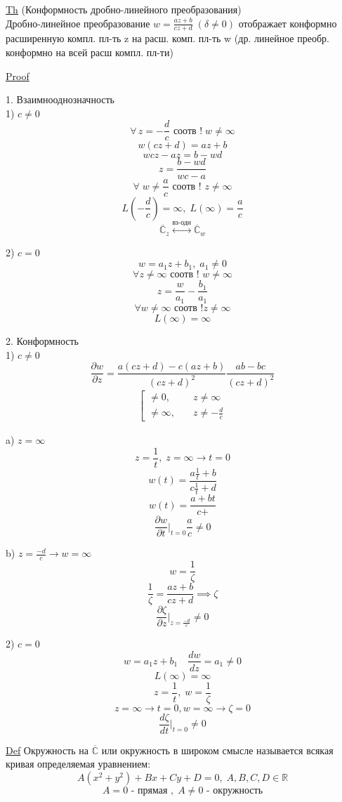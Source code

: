 \documentclass[a4paper]{article}
\begin{document}
\begin{tcolorbox}
\underline{Th} (Конформность дробно-линейного преобразования)\\
Дробно-линейное преобразование $ w = \frac{az + b}{cz + d}\; (\delta \neq 0) $ 
отображает конформно расширенную компл. пл-ть z на расш. комп. пл-ть w
(др. линейное преобр. конформно на всей расш компл. пл-ти)

\underline{Proof}

1. Взаимнооднозначность\\
1) $ c \neq 0 $ 
\[
    \forall \, z = -\frac{d}{c} \text{ соотв } !\; w \neq \infty
\]
\[
    w(cz+d) = az + b
\]
\[
    wcz - az = b -wd
\]
\[
    z = \frac{b - wd}{wc-a} 
\]
\[
    \forall \; w \neq \frac{a}{c} \text{ соотв ! } z \neq \infty
\]
\[
    L(-\frac{d}{c}) = \infty, \; L(\infty) = \frac{a}{c} 
\]
\[
    \mathbb{\overline{C}}_{z} \stackrel{\text{вз-одн}}{\leftrightarrow}
    \mathbb{\overline{C}}_{w}
\]

2) $ c = 0 $ 
\[
    w = a_1 z + b_1, \; a_1 \neq 0
\]
\[
    \forall z \neq \infty \text{ соотв ! } w \neq \infty
\]
\[
    z = \frac{w}{a_1} - \frac{b_1}{a_1} 
\]
\[
    \forall w \neq \infty \text{ соотв !} z \neq \infty
\]
\[
    L(\infty) = \infty
\]

2. Конформность\\
1) $ c \neq 0 $ 
\[
    \frac{\partial w}{\partial z} = \frac{a(cz+d) - c(az+b)}{(cz+d)^2} 
    \frac{ab - bc}{(cz+d)^2} 
\]
\begin{align*}
    \left[
    \begin{array}{ll}
        \neq 0, &\quad z \neq \infty \\
        \neq \infty, &\quad z \neq -\frac{d}{c} 
    \end{array}
    \right .
    \end{align*}

a) $ z = \infty $ 
\[
    z = \frac{1}{t}, \; z = \infty \rightarrow t = 0
\]
\[
    w(t) = \frac{a \frac{1}{t} + b}{c \frac{1}{t} + d} 
\]
\[
    w(t) = \frac{a + bt}{c + ^{}} 
\]
\[
    \frac{\partial w}{\partial t} |_{t=0} \frac{a}{c} \neq 0
\]

b) $ z = \frac{-d}{c} \rightarrow w = \infty $ 
\[
    w = \frac{1}{\zeta} 
\]
\[
    \frac{1}{\zeta} = \frac{az + b}{cz + d} \implies \zeta
\]
\[
    \frac{\partial \zeta}{\partial z} |_{z = \frac{-d}{c} } \neq 0
\]
\end{tcolorbox}

\begin{tcolorbox}
2) $ c = 0 $ 
\[
    w = a_1 z + b_1 \quad \frac{dw}{dz} = a_1 \neq 0
\]
\[
    L(\infty) = \infty
\]
\[
    z = \frac{1}{t}, \; w = \frac{1}{\zeta} 
\]
\[
    z = \infty \rightarrow t = 0, w = \infty \rightarrow \zeta = 0
\]
\[
    \frac{d\zeta}{dt} |_{t=0} \neq 0
\]
\end{tcolorbox}

\underline{Def} Окружность на $ \mathbb{\overline{C}} $ или окружность в широком
смысле называется всякая кривая определяемая уравнением:
\[
    A(x^2 + y^2) + Bx + Cy + D = 0,\; A,B,C,D \in \mathbb{R}
\]
\[
    A = 0 \text{ - прямая }, \; A \neq 0 \text{ - окружность}
\]
\end{document}

